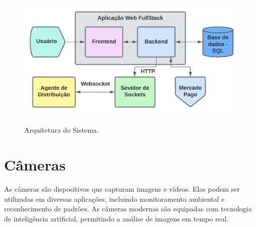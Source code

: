 \begin{figure}[h]
	\centering
	\caption{Arquitetura do Sistema.}
	\includegraphics[width=1\textwidth]{figuras/Arquitetura.png}
	\label{fig:system_architecture}
\end{figure}

\section{Câmeras}
As câmeras são dispositivos que capturam imagens e vídeos. Elas podem ser utilizadas em diversas aplicações, incluindo monitoramento ambiental e reconhecimento de padrões. As câmeras modernas são equipadas com tecnologia de inteligência artificial, permitindo a análise de imagens em tempo real.

